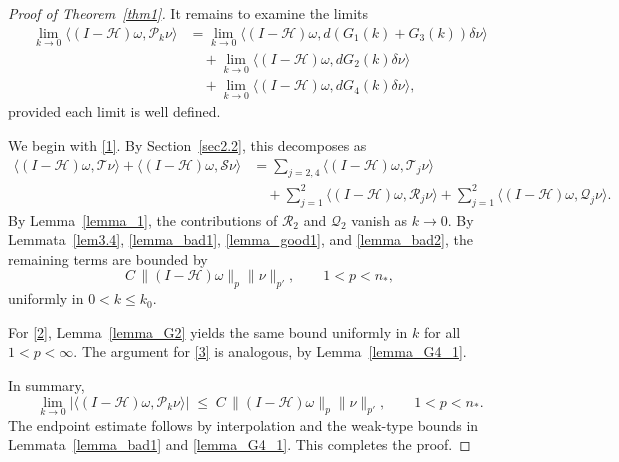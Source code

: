 \documentclass[12pt]{amsart}
\begin{document}
\begin{proof}[Proof of Theorem~\ref{thm1}]
It remains to examine the limits
\begin{align}\label{1}
    \lim_{k\to0}\langle (I-\mathcal{H})\omega, \mathcal{P}_k\nu \rangle
    &= \lim_{k\to0}\langle (I-\mathcal{H})\omega, d(G_1(k)+G_3(k))\delta\nu \rangle \\ \label{2}
    &\quad + \lim_{k\to0}\langle (I-\mathcal{H})\omega, dG_2(k)\delta\nu \rangle \\ \label{3}
    &\quad + \lim_{k\to0}\langle (I-\mathcal{H})\omega, dG_4(k)\delta\nu \rangle,
\end{align}
provided each limit is well defined.

We begin with \eqref{1}. By Section~\ref{sec2.2}, this decomposes as
\begin{align*}
    \langle (I-\mathcal{H})\omega, \mathcal{T}\nu \rangle
    + \langle (I-\mathcal{H})\omega, \mathcal{S}\nu \rangle
    &= \sum_{j=2,4} \langle (I-\mathcal{H})\omega, \mathcal{T}_j\nu \rangle \\
    &\quad + \sum_{j=1}^2 \langle (I-\mathcal{H})\omega, \mathcal{R}_j\nu \rangle
           + \sum_{j=1}^2 \langle (I-\mathcal{H})\omega, \mathcal{Q}_j\nu \rangle.
\end{align*}
By Lemma~\ref{lemma_1}, the contributions of $\mathcal{R}_2$ and $\mathcal{Q}_2$ vanish as $k\to0$. By Lemmata~\ref{lem3.4}, \ref{lemma_bad1}, \ref{lemma_good1}, and \ref{lemma_bad2}, the remaining terms are bounded by
\[
C\,\|(I-\mathcal{H})\omega\|_p \|\nu\|_{p'}, \qquad 1<p<n_*,
\]
uniformly in $0<k\le k_0$.

For \eqref{2}, Lemma~\ref{lemma_G2} yields the same bound uniformly in $k$ for all $1<p<\infty$. The argument for \eqref{3} is analogous, by Lemma~\ref{lemma_G4_1}.  

In summary,
\[
\lim_{k\to0} \big|\langle (I-\mathcal{H})\omega, \mathcal{P}_k\nu \rangle\big|
\;\le\; C\,\|(I-\mathcal{H})\omega\|_p \|\nu\|_{p'}, \qquad 1<p<n_*.
\]
The endpoint estimate follows by interpolation and the weak-type bounds in Lemmata~\ref{lemma_bad1} and \ref{lemma_G4_1}. This completes the proof.
\end{proof}
\end{document}
